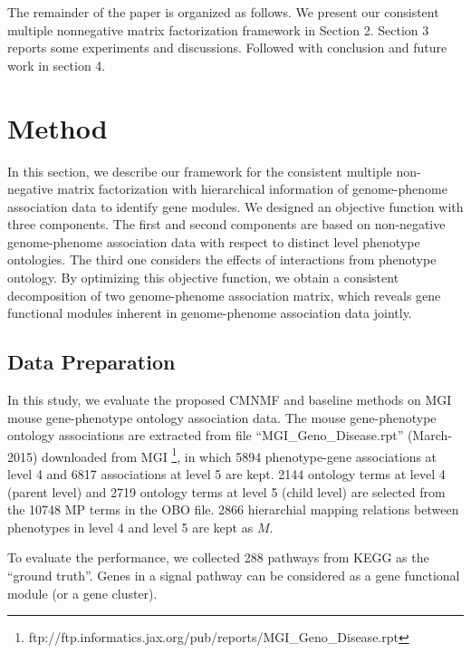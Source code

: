 \documentclass{bmcart}
\begin{document}
The remainder of the paper is organized as follows. We present our consistent multiple nonnegative matrix factorization framework in Section 2. Section 3 reports some experiments and discussions. Followed with conclusion and future work in section 4.


\section*{Method}
In this section, we describe our framework for the consistent multiple non-negative matrix
factorization with hierarchical information of genome-phenome association data to identify gene modules.
We designed an objective function with three components. The first and second components are based on non-negative genome-phenome association data with respect to distinct level phenotype ontologies. The third one considers the effects of interactions from phenotype ontology. By optimizing this objective function, we obtain a consistent decomposition of two genome-phenome association matrix, which reveals gene functional modules inherent in genome-phenome association data jointly.

\subsection*{Data Preparation}
In this study, we evaluate the proposed CMNMF and baseline methods on MGI mouse gene-phenotype ontology association data. The mouse gene-phenotype ontology associations are extracted from file ``MGI\_Geno\_Disease.rpt'' (March-2015) downloaded from MGI \footnote[1]{ftp://ftp.informatics.jax.org/pub/reports/MGI\_Geno\_Disease.rpt}, in which 5894 phenotype-gene associations at level 4 and 6817 associations at level 5 are kept. 2144 ontology terms at level 4 (parent level) and 2719 ontology terms at level 5 (child level)  are selected from the 10748 MP terms in the OBO file. 2866 hierarchial mapping relations between phenotypes in level 4 and level 5 are kept as $M$.

To evaluate the performance, we collected 288 pathways from KEGG as the ``ground truth''. Genes in a signal pathway can be considered as a gene functional module (or a gene cluster).
\end{document}
